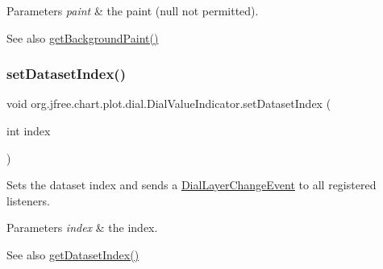\begin{DoxyParams}{Parameters}
{\em paint} & the paint ({\ttfamily null} not permitted).\\
\hline
\end{DoxyParams}
\begin{DoxySeeAlso}{See also}
\mbox{\hyperlink{classorg_1_1jfree_1_1chart_1_1plot_1_1dial_1_1_dial_value_indicator_a23efc254350c58403200408b76bfa76b}{get\+Background\+Paint()}} 
\end{DoxySeeAlso}
\mbox{\label{classorg_1_1jfree_1_1chart_1_1plot_1_1dial_1_1_dial_value_indicator_a0880bbfe31f19c02655f9565c9ac9e16}} 
\subsubsection{\texorpdfstring{set\+Dataset\+Index()}{setDatasetIndex()}}
{\footnotesize\ttfamily void org.\+jfree.\+chart.\+plot.\+dial.\+Dial\+Value\+Indicator.\+set\+Dataset\+Index (\begin{DoxyParamCaption}\item[{int}]{index }\end{DoxyParamCaption})}

Sets the dataset index and sends a \mbox{\hyperlink{classorg_1_1jfree_1_1chart_1_1plot_1_1dial_1_1_dial_layer_change_event}{Dial\+Layer\+Change\+Event}} to all registered listeners.


\begin{DoxyParams}{Parameters}
{\em index} & the index.\\
\hline
\end{DoxyParams}
\begin{DoxySeeAlso}{See also}
\mbox{\hyperlink{classorg_1_1jfree_1_1chart_1_1plot_1_1dial_1_1_dial_value_indicator_adc50504d695c87e02091fa5e50fe5d5d}{get\+Dataset\+Index()}} 
\end{DoxySeeAlso}
\mbox{\label{classorg_1_1jfree_1_1chart_1_1plot_1_1dial_1_1_dial_value_indicator_adacfbbcb8506fadca263056f4e062e28}} 
